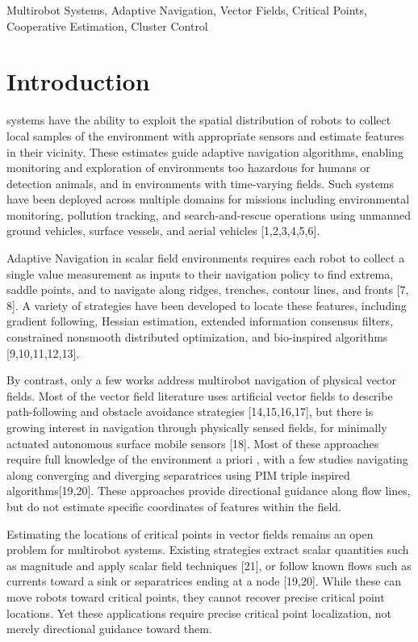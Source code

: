\documentclass[lettersize,journal]{IEEEtran}
\begin{document}
\begin{IEEEkeywords}
Multirobot Systems, Adaptive Navigation, Vector Fields, Critical Points, Cooperative Estimation, Cluster Control
\end{IEEEkeywords}



\section{Introduction}

 systems have the ability to exploit the spatial distribution of robots to collect local samples of the environment with appropriate sensors and estimate features in their vicinity. These estimates guide adaptive navigation algorithms, enabling monitoring and exploration of environments too hazardous for humans or detection animals, and in environments with time-varying fields. Such systems have been deployed across multiple domains for missions including environmental monitoring, pollution tracking, and search-and-rescue operations using unmanned ground vehicles, surface vessels, and aerial vehicles [1,2,3,4,5,6].

Adaptive Navigation in scalar field environments requires each robot to collect a single value measurement as inputs to their navigation policy to find extrema, saddle points, and to navigate along ridges, trenches, contour lines, and fronts [7, 8]. A variety of strategies have been developed to locate these features, including gradient following, Hessian estimation, extended information consensus filters, constrained nonsmooth distributed optimization, and bio-inspired algorithms [9,10,11,12,13].

By contrast, only a few works address multirobot navigation of physical vector fields. Most of the vector field literature uses artificial vector fields to describe path-following and obstacle avoidance strategies [14,15,16,17], but there is growing interest in navigation through physically sensed fields, for minimally actuated autonomous surface mobile sensors [18]. Most of these approaches require full knowledge of the environment a priori , with a few studies navigating along converging and diverging separatrices using PIM triple inspired algorithms[19,20]. These approaches provide directional guidance along flow lines, but do not estimate specific coordinates of features within the field.

Estimating the locations of critical points in vector fields remains an open problem for multirobot systems. Existing strategies extract scalar quantities such as magnitude and apply scalar field techniques [21], or follow known flows such as currents toward a sink or separatrices ending at a node [19,20]. While these can move robots toward critical points, they cannot recover precise critical point locations. Yet these applications require precise critical point localization, not merely directional guidance toward them.
\end{document}
